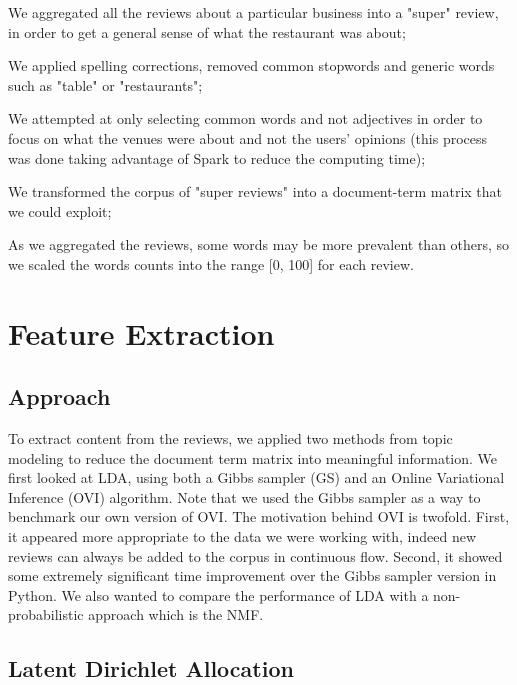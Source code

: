 \documentclass[twoside]{article}
\begin{document}
\begin{multicols}{2}
\begin{compactitem}
    \item We aggregated all the reviews about a particular business into a "super" review, in order to get a general sense of what the restaurant was about;
    \item We applied spelling corrections, removed common stopwords and generic words such as "table" or "restaurants";
    \item We attempted at only selecting common words and not adjectives in order to focus on what the venues were about and not the users' opinions (this process was done taking advantage of Spark to reduce the computing time);
    \item We transformed the corpus of "super reviews" into a document-term matrix that we could exploit;
    \item As we aggregated the reviews, some words may be more prevalent than others, so we scaled the words counts into the range [0, 100] for each review.
\end{compactitem}


\section{Feature Extraction}

\subsection{Approach}

To extract content from the reviews, we applied two methods from topic modeling to reduce the document term matrix into meaningful information. We first looked at LDA, using both a Gibbs sampler (GS) and an Online Variational Inference (OVI) algorithm. Note that we used the Gibbs sampler as a way to benchmark our own version of OVI. The motivation behind OVI is twofold. First, it appeared more appropriate to the data we were working with, indeed new reviews can always be added to the corpus in continuous flow. Second, it showed some extremely significant time improvement over the Gibbs sampler version in Python. We also wanted to compare the performance of LDA with a non-probabilistic approach which is the NMF. 

\subsection{Latent Dirichlet Allocation}


\end{multicols}
\end{document}
